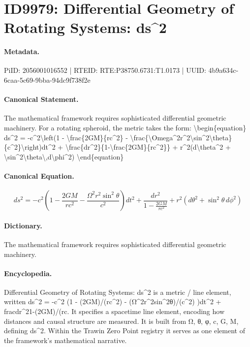 \section*{ID9979: Differential Geometry of Rotating Systems: ds\textasciicircum{}2}
\paragraph{Metadata.}
PiID: 2056001016552 | RTEID: RTE:P38750.6731:T1.0173 | UUID: 4b9a634c-6caa-5c69-9bba-94dc9f738f2e

\paragraph{Canonical Statement.}
The mathematical framework requires sophisticated differential geometric machinery. For a rotating spheroid, the metric takes the form: \textbackslash{}begin\{equation\} ds\textasciicircum{}2 = -c\textasciicircum{}2\textbackslash{}left(1 - \textbackslash{}frac\{2GM\}\{rc\textasciicircum{}2\} - \textbackslash{}frac\{\textbackslash{}Omega\textasciicircum{}2r\textasciicircum{}2\textbackslash{}sin\textasciicircum{}2\textbackslash{}theta\}\{c\textasciicircum{}2\}\textbackslash{}right)dt\textasciicircum{}2 + \textbackslash{}frac\{dr\textasciicircum{}2\}\{1-\textbackslash{}frac\{2GM\}\{rc\textasciicircum{}2\}\} + r\textasciicircum{}2(d\textbackslash{}theta\textasciicircum{}2 + \textbackslash{}sin\textasciicircum{}2\textbackslash{}theta\textbackslash{},d\textbackslash{}phi\textasciicircum{}2) \textbackslash{}end\{equation\}

\paragraph{Canonical Equation.}
\[
ds^2 = -c^2\left(1 - \frac{2GM}{rc^2} - \frac{\Omega^2r^2\sin^2\theta}{c^2}\right)dt^2 + \frac{dr^2}{1-\frac{2GM}{rc^2}} + r^2(d\theta^2 + \sin^2\theta\,d\phi^2)
\]

\paragraph{Dictionary.}
The mathematical framework requires sophisticated differential geometric machinery.

\paragraph{Encyclopedia.}
Differential Geometry of Rotating Systems: ds\textasciicircum{}2 is a metric / line element, written ds\textasciicircum{}2 = -c\textasciicircum{}2 (1 - (2GM)/(rc\textasciicircum{}2) - (Ω\textasciicircum{}2r\textasciicircum{}2sin\textasciicircum{}2θ)/(c\textasciicircum{}2) )dt\textasciicircum{}2 + fracdr\textasciicircum{}21-(2GM)/(rc. It specifies a spacetime line element, encoding how distances and causal structure are measured. It is built from Ω, θ, φ, c, G, M, defining ds\textasciicircum{}2. Within the Trawin Zero Point registry it serves as one element of the framework's mathematical narrative.
